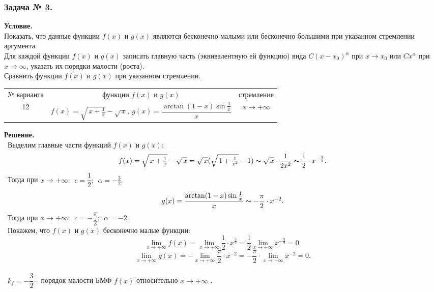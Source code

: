 \documentclass[12pt]{article}
\begin{document}
\subsubsection*{\center Задача № 3.}
{\bf Условие.~}\\
 Показать, что данные функции
$f(x)$ и $g(x)$ являются бесконечно малыми или бесконечно большими
при указанном стремлении аргумента. \\
 Для каждой функции $f(x)$ и $g(x)$ записать главную часть
(эквивалентную ей функцию)  вида $C(x-x_0)^{\alpha}$ при $x\rightarrow x_0$ или $Cx^{\alpha}$
при $x\rightarrow\infty$, указать их порядки малости (роста). \\
 Сравнить функции $f(x)$ и $g(x)$ при указанном стремлении.
\begin{center}
	\begin{tabular}{|c|c|c|}
		\hline
		№ варианта & функции $f(x)$ и $g(x)$ & стремление \\[6pt]
		12 & $f(x) = \sqrt{\,x+\frac{1}{x}}-\sqrt{\,x}, ~g(x)=\dfrac{\arctan(1-x)\sin{\frac{1}{x}}}{x}$ & $x\rightarrow+\infty$ \\
		\hline
	\end{tabular}
\end{center}
{\bf Решение.~}\\
~Выделим главные части функций $f(x)$ и $g(x)$:
$$
\begin{array}{cc}
f(x) = \sqrt{\,x+\frac{1}{x}}-\sqrt{\,x} = \sqrt{\,x}(\sqrt{\,1+\frac{1}{x^2}}-1) \thicksim 
\sqrt{\,x}\cdot \dfrac{1}{2x^2} \thicksim \dfrac{1}{2}\cdot x^{-\frac{3}{2}}.
\end{array}
$$
~Тогда при $x\rightarrow+\infty:\ \ c=\dfrac{1}{2};\ \ \alpha={-\frac{3}{2}}.$
$$
\begin{array}{cc}
g(x) = \dfrac{\arctan(1-x)\sin{\frac{1}{x}}}{x} \thicksim -\dfrac{\pi}{2}\cdot x^{-2}.
\end{array}
$$
~Тогда при $x\rightarrow+\infty:\ \ c=-\dfrac{\pi}{2};\ \ \alpha=-2.$
$$
$$
~Покажем, что $f(x)$ и $g(x)$ бесконечно малые функции:
$$ 
\lim\limits_{x\rightarrow+\infty}f(x) =
\lim\limits_{x\rightarrow+\infty}\dfrac{1}{2}\cdot x^{\frac{3}{2}} = \dfrac{1}{2}\lim\limits_{x\rightarrow+\infty}x^{-\frac{3}{2}} = 0.
$$
$$
\lim\limits_{x\rightarrow+\infty}g(x) = -\lim\limits_{x\rightarrow+\infty}\dfrac{\pi}{2}\cdot x^{-2} =
-\dfrac{\pi}{2}\cdot\lim\limits_{x\rightarrow+\infty}x^{-2} = 0.
$$ \\
~$k_f = -\dfrac{3}{2}$ - порядок малости БМФ $f(x)$ относительно $x\rightarrow+\infty$ . \\
\end{document}
